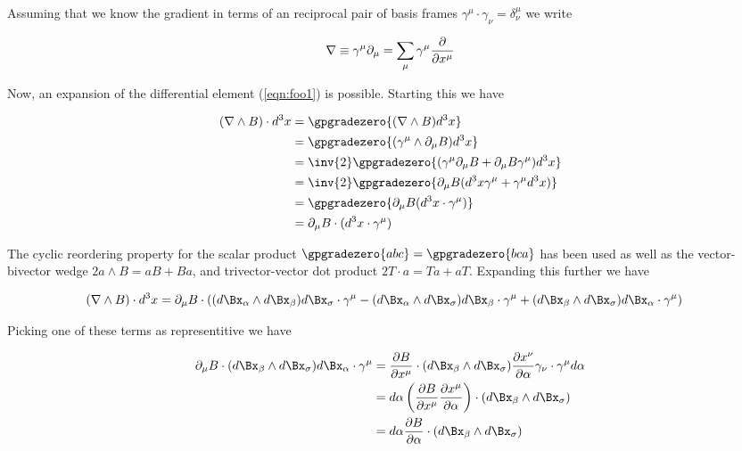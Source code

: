 Assuming that we know the gradient in terms of an reciprocal pair of basis frames $\gamma^\mu \cdot \gamma_\nu = \delta^\mu_\nu$ we write

\begin{align}\label{eqn:foo3}
\nabla \equiv \gamma^\mu \partial_\mu = \sum_\mu \gamma^\mu \frac{\partial {}}{\partial {x^\mu}}
\end{align}

Now, an expansion of the differential element (\ref{eqn:foo1}) is possible.  Starting this we have

\begin{align*}
(\grad \wedge B) \cdot d^3 x
&=
\gpgradezero{ (\grad \wedge B) d^3 x } \\
&=
\gpgradezero{ (\gamma^\mu \wedge \partial_\mu B) d^3 x } \\
&=
\inv{2} \gpgradezero{ (\gamma^\mu \partial_\mu B + \partial_\mu B \gamma^\mu) d^3 x } \\
&=
\inv{2} \gpgradezero{ \partial_\mu B (d^3 x \gamma^\mu + \gamma^\mu d^3 x) } \\
&=
\gpgradezero{ \partial_\mu B (d^3 x \cdot \gamma^\mu) } \\
&=
\partial_\mu B \cdot (d^3 x \cdot \gamma^\mu) 
\end{align*}

The cyclic reordering property for the scalar product $\gpgradezero{a b c} = \gpgradezero{ b c a}$ has been used as well as the vector-bivector wedge $2 a \wedge B = a B + B a$, and trivector-vector dot product $2 T \cdot a = T a + a T$.  Expanding this further we have

\begin{align*}
(\grad \wedge B) \cdot d^3 x
&=
\partial_\mu B \cdot \left(
 (d\Bx_\alpha \wedge d\Bx_\beta) d\Bx_\sigma \cdot \gamma^\mu
-(d\Bx_\alpha \wedge d\Bx_\sigma) d\Bx_\beta \cdot \gamma^\mu
+(d\Bx_\beta  \wedge d\Bx_\sigma) d\Bx_\alpha \cdot \gamma^\mu
\right)
\end{align*}

Picking one of these terms as representitive we have

\begin{align*}
\partial_\mu B \cdot (d\Bx_\beta \wedge d\Bx_\sigma) d\Bx_\alpha \cdot \gamma^\mu
&=
\PD{x^\mu}{B} \cdot (d\Bx_\beta \wedge d\Bx_\sigma) \PD{\alpha}{x^\nu} \gamma_\nu \cdot \gamma^\mu d\alpha \\
&=
d\alpha \left( \PD{x^\mu}{B} \PD{\alpha}{x^\mu} \right) \cdot (d\Bx_\beta \wedge d\Bx_\sigma) \\
&=
d\alpha \PD{\alpha}{B} \cdot (d\Bx_\beta \wedge d\Bx_\sigma) \\
\end{align*}

